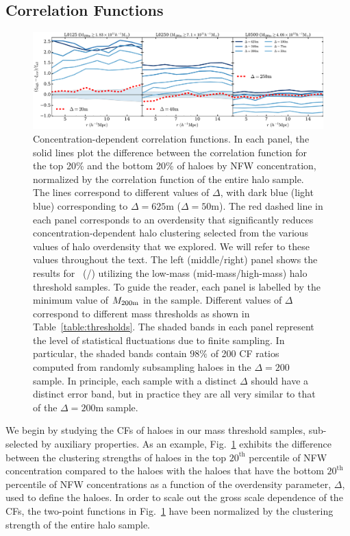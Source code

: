 \documentclass[usenatbib,fleqn]{mnras}
\begin{document}
\subsection{Correlation Functions}
\label{sub:cfresults}


\begin{figure}
	\centering
	\includegraphics[width=\textwidth]{all_cfcompare_cnfw.pdf}
	\caption{
Concentration-dependent correlation functions. In each panel, the solid lines plot the difference between the correlation function for the top 20\% and the bottom 20\% of haloes by NFW concentration, normalized by the correlation function of the entire halo sample. The lines correspond to different values of $\Delta$, with dark blue (light blue) corresponding to $\Delta = 625$m ($\Delta = 50$m). The red dashed line in each panel  corresponds to an overdensity that significantly reduces concentration-dependent halo clustering selected from the various values of halo overdensity that we explored. We will refer to these values throughout the text. The left (middle/right) panel shows the results for \simA \ (\simB /\simC) utilizing the low-mass (mid-mass/high-mass) halo threshold samples. To guide the reader, each panel is labelled by the minimum value of $M_{200{\rm m}}$ in the sample. Different values of $\Delta$ correspond to different mass thresholds as shown in Table~\ref{table:thresholds}. The shaded bands in each panel represent the level of statistical fluctuations due to finite sampling. In particular, the shaded bands contain $98\%$ of 200 CF ratios computed from randomly subsampling haloes in the $\Delta=200$ sample. In principle, each sample with a distinct $\Delta$ should have a distinct error band, but in practice they are all very similar to that of the $\Delta=200$m sample.
}
\label{fig:cc_cfcompare}
\end{figure}

We begin by studying the CFs of haloes in our mass threshold samples, sub-selected by auxiliary properties. As an example, Fig.~\ref{fig:cc_cfcompare} exhibits the difference between the clustering strengths of haloes in the top $20^{\mathrm{th}}$ percentile of NFW concentration compared to the haloes with the haloes that have the
bottom $20^{\mathrm{th}}$ percentile of NFW concentrations as a function of the overdensity parameter, $\Delta$, used to define the haloes. In order to scale out the gross scale dependence of the CFs, the two-point functions in Fig.~\ref{fig:cc_cfcompare} have been normalized by the clustering strength of the entire halo sample. 
\end{document}
